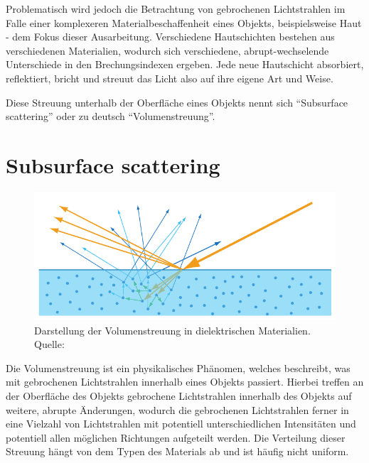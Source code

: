 \documentclass[ngerman,runningheads,a4paper]{llncs}[2018/03/10]
\begin{document}
Problematisch wird jedoch die Betrachtung von gebrochenen Lichtstrahlen im Falle einer komplexeren Materialbeschaffenheit eines Objekts, beispielsweise Haut - dem Fokus dieser Ausarbeitung.
Verschiedene Hautschichten bestehen aus verschiedenen Materialien, wodurch sich verschiedene, abrupt-wechselende Unterschiede in den Brechungsindexen ergeben.
Jede neue Hautschicht absorbiert, reflektiert, bricht und streuut das Licht also auf ihre eigene Art und Weise.

Diese Streuung unterhalb der Oberfläche eines Objekts nennt sich \enquote{Subsurface scattering} oder zu deutsch \enquote{Volumenstreuung}.

\section{Subsurface scattering}
\label{sec:subsurface}

\begin{figure}
  \centering
  \includegraphics[scale=0.4,keepaspectratio]{./images/subsurface-scattering-illustration.jpg}
  \caption{Darstellung der Volumenstreuung in dielektrischen Materialien. Quelle: \cite{real-time-rendering}}
  \label{fig:subsurface-scattering}
\end{figure}

Die Volumenstreuung ist ein physikalisches Phänomen, welches beschreibt, was mit gebrochenen Lichtstrahlen innerhalb eines Objekts passiert.
Hierbei treffen an der Oberfläche des Objekts gebrochene Lichtstrahlen innerhalb des Objekts auf weitere, abrupte Änderungen, wodurch die gebrochenen Lichtstrahlen ferner in eine Vielzahl von Lichtstrahlen mit potentiell unterschiedlichen Intensitäten und potentiell allen möglichen Richtungen aufgeteilt werden.
Die Verteilung dieser Streuung hängt von dem Typen des Materials ab und ist häufig nicht uniform.
\end{document}
